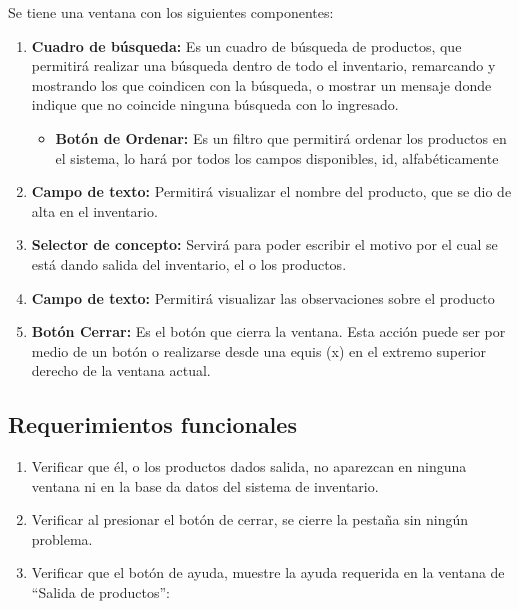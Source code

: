\documentclass[a4paper,DIV=12]{scrreprt}
\begin{document}
Se tiene una ventana con los siguientes componentes: 

\begin{enumerate}
	\item{\textbf{Cuadro de búsqueda:} Es un cuadro de búsqueda de productos, que permitirá realizar una búsqueda dentro de todo el inventario, remarcando y mostrando los que coindicen con la búsqueda, o mostrar un mensaje donde indique que no coincide ninguna búsqueda con lo ingresado.  }	
	\begin{itemize}
		\item{\textbf{Botón de Ordenar:} Es un filtro que permitirá ordenar los productos en el sistema, lo hará por todos los campos disponibles, id, alfabéticamente }
	\end{itemize}

	\item{\textbf{Campo de texto:} Permitirá visualizar el nombre del producto, que se dio de alta en el inventario.}			
	
	\item{\textbf{Selector de concepto:} Servirá para poder escribir el motivo por el cual se está dando salida del inventario, el o los productos.}
				
	\item {\textbf{Campo de texto:} Permitirá visualizar las observaciones sobre el producto}
	\item{\textbf{Botón Cerrar:} Es el botón que cierra la ventana. Esta acción puede ser por medio de un botón o realizarse desde una equis (x) en el extremo superior derecho de la ventana actual.}	
			
\end{enumerate}

\subsection*{Requerimientos funcionales}
\begin{enumerate}
	\item{Verificar que él, o los productos dados salida, no aparezcan en ninguna ventana ni en la base da datos del sistema de inventario.}		
	\item{Verificar al presionar el botón de cerrar, se cierre la pestaña sin ningún problema. }		
	\item{Verificar que el botón de ayuda, muestre la ayuda requerida en la ventana de “Salida de productos”:  }				
\end{enumerate}
\newpage
\setcounter{chapter}{2}
\setcounter{section}{-1}
\setcounter{subsection}{-1}
\end{document}
